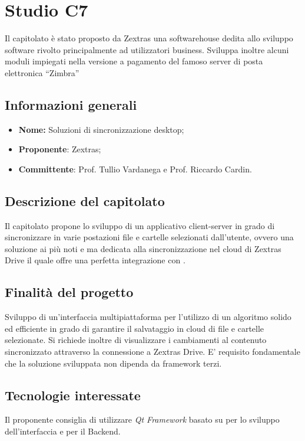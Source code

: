 \section{Studio C7}

Il capitolato è stato proposto da Zextras una softwarehouse dedita allo sviluppo software rivolto principalmente ad utilizzatori business.
Sviluppa inoltre alcuni moduli impiegati nella versione a pagamento del famoso server di posta elettronica “Zimbra”

\subsection{Informazioni generali}
\begin{itemize}
	\item \textbf{Nome:} Soluzioni di sincronizzazione desktop;
	\item \textbf{Proponente}: Zextras;
	\item \textbf{Committente}: Prof. Tullio Vardanega e Prof. Riccardo Cardin.
\end{itemize}

\subsection{Descrizione del capitolato}
Il capitolato propone lo sviluppo di un applicativo client-server in grado di sincronizzare in varie postazioni file e cartelle selezionati dall’utente, ovvero una soluzione ai più noti \textit{} e \textit{} ma dedicata alla sincronizzazione nel cloud di Zextras Drive il quale offre una perfetta integrazione con \textit{}.

\subsection{Finalità del progetto}
Sviluppo di un’interfaccia multipiattaforma per l’utilizzo di un algoritmo solido ed efficiente in grado di garantire il salvataggio in cloud di file e cartelle selezionate.
Si richiede inoltre di visualizzare i cambiamenti al contenuto sincronizzato attraverso la connessione a Zextras Drive. E’ requisito fondamentale che la soluzione sviluppata non dipenda da framework terzi.


\subsection{Tecnologie interessate}
Il proponente consiglia di utilizzare \textit{Qt Framework} basato su  per lo sviluppo dell’interfaccia e \textit{} per il Backend.


